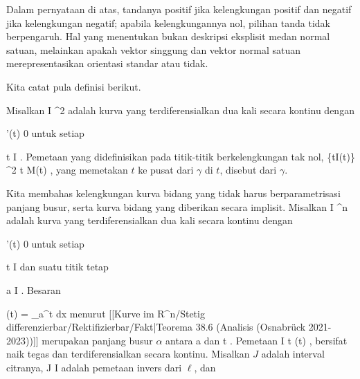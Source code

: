 Dalam pernyataan di atas, tandanya positif jika kelengkungan positif dan negatif jika kelengkungan negatif; apabila kelengkungannya nol, pilihan tanda tidak berpengaruh. Hal yang menentukan bukan deskripsi eksplisit medan normal satuan, melainkan apakah vektor singgung dan vektor normal satuan merepresentasikan orientasi standar atau tidak.

Kita catat pula definisi berikut.

{}
{

Misalkan
\maabb {\gamma} { I } { \R^2
} {}
adalah kurva yang terdiferensialkan dua kali secara kontinu dengan

\mavergleichskette
{\vergleichskette
{ \gamma'(t)
}
{ \neq }{ 0
}
{  }{
}
{    }{
}
{   }{
}
}
{}{}{}
untuk setiap

\mavergleichskette
{\vergleichskette
{ t
}
{ \in }{ I
}
{  }{
}
{    }{
}
{   }{
}
}
{}{}{.}
Pemetaan yang didefinisikan pada titik-titik berkelengkungan tak nol,
\maabbeledisp {} { \{t\in I\mid \kappa(t)\} } { \R^2
} { t } { M(t)
} {,}
yang memetakan $t$ ke pusat
dari $\gamma$ di $t$, disebut
dari $\gamma$.

}


Kita membahas kelengkungan kurva bidang yang tidak harus berparametrisasi panjang busur, serta kurva bidang yang diberikan secara implisit. Misalkan
\maabbdisp {\alpha} {I} { \R^n
} {}
adalah kurva yang terdiferensialkan dua kali secara kontinu dengan

\mavergleichskette
{\vergleichskette
{ \alpha'(t)
}
{ \neq }{ 0
}
{  }{
}
{    }{
}
{   }{
}
}
{}{}{}
untuk setiap

\mavergleichskette
{\vergleichskette
{ t
}
{ \in }{ I
}
{  }{
}
{    }{
}
{   }{
}
}
{}{}{}
dan suatu titik tetap

\mavergleichskette
{\vergleichskette
{ a
}
{ \in }{ I
}
{  }{
}
{    }{
}
{   }{
}
}
{}{}{.}
Besaran

\mavergleichskettedisp
{\vergleichskette
{ \ell(t)
}
{ =} { \int_a^t  \Vert dx
}
{ } {
}
{ } {
}
{ } {
}
}
{}{}{}
menurut
[[Kurve im R^n/Stetig differenzierbar/Rektifizierbar/Fakt|Teorema 38.6 (Analisis (Osnabrück 2021-2023))]]
merupakan panjang busur $\alpha$ antara
\mathkor {} {a} {dan} {t} {.}
Pemetaan
\maabbeledisp {\ell} {I} { \R
} {t} { \ell(t)
} {,}
bersifat naik tegas dan terdiferensialkan secara kontinu. Misalkan $J$ adalah interval citranya,
\maabb {\beta} {J} {I
} {}
adalah pemetaan invers dari $\ell$, dan

